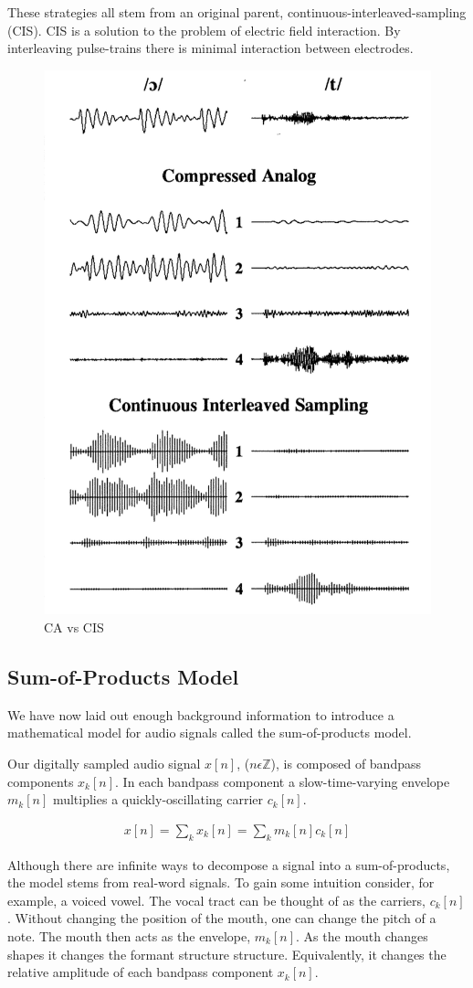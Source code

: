 \documentclass [11pt, proquest,oneside] {uwthesis}[2015/03/03]
\begin{document}
These strategies all stem from an original parent, continuous-interleaved-sampling (CIS).  CIS is a solution to the problem of electric field interaction.  By interleaving pulse-trains there is minimal interaction between electrodes.


\begin{figure}[!ht]
  \centering
    \includegraphics[width=.5\textwidth]{caVScis}   
    \caption{CA vs CIS}
\end{figure}

\subsection{Sum-of-Products Model}

We have now laid out enough background information to introduce a mathematical model for audio signals called the sum-of-products model.

Our digitally sampled audio signal $x[n]$, ($n \epsilon \mathbb{Z}$), is composed of bandpass components $x_k[n]$.  In each bandpass component a slow-time-varying envelope $m_k[n]$ multiplies a quickly-oscillating carrier $c_k[n]$.

\begin{align}
\label{eq:sum-of-products}
x[n] = \sum\limits_k x_k[n] = \sum\limits_k m_k[n] c_k[n]
\end{align}

Although there are infinite ways to decompose a signal into a sum-of-products, the model stems from real-word signals.  To gain some intuition consider, for example, a voiced vowel.  The vocal tract can be thought of as the carriers, $c_k[n]$.  Without changing the position of the mouth, one can change the pitch of a note.  The mouth then acts as the envelope, $m_k[n]$.  As the mouth changes shapes it changes the formant structure structure.  Equivalently, it changes the relative amplitude of each bandpass component $x_k[n]$.
\end{document}
